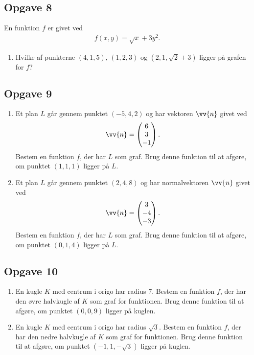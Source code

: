 \subsection*{Opgave 8}
En funktion $f$ er givet ved 
\begin{align*}
	f(x,y) = \sqrt{x} + 3y^2.
\end{align*}
\begin{enumerate}[label=\roman*)]
	\item Hvilke af punkterne $(4,1,5)$, $(1,2,3)$ og $(2,1,\sqrt{2}+3)$ ligger på grafen for $f$?
\end{enumerate}
\subsection*{Opgave 9}
\begin{enumerate}[label=\roman*)]
	\item Et plan $L$ går gennem punktet $(-5,4,2)$ og har vektoren $\vv{n}$ givet ved
	\begin{align*}
		\vv{n} = 
		\begin{pmatrix}
			6 \\ 3 \\ -1
		\end{pmatrix}.
	\end{align*}
	Bestem en funktion $f$, der har $L$ som graf. Brug denne funktion til at afgøre, om punktet $(1,1,1)$ ligger på $L$.
	\item Et plan $L$ går gennem punktet $(2,4,8)$ og har normalvektoren $\vv{n}$ givet ved
	\begin{align*}
		\vv{n} = 
		\begin{pmatrix}
			3 \\ -4 \\ -3
		\end{pmatrix}.
	\end{align*}
	Bestem en funktion $f$, der har $L$ som graf. Brug denne funktion til at afgøre, om punktet $(0,1,4)$ ligger på $L$.
\end{enumerate}

\subsection*{Opgave 10}
\begin{enumerate}[label=\roman*)]
	\item En kugle $K$ med centrum i origo har radius $7$. Bestem en funktion $f$, der har den øvre halvkugle af $K$ som graf for funktionen. Brug denne funktion til at afgøre, 
	om punktet $(0,0,9)$ ligger på kuglen. 
	\item En kugle $K$ med centrum i origo har radius $\sqrt{3}$. Bestem en funktion $f$, der har den nedre halvkugle af $K$ som graf for funktionen. Brug denne funktion til at 
	afgøre, 	om punktet $(-1,1,-\sqrt{3})$ ligger på kuglen. 
\end{enumerate}

